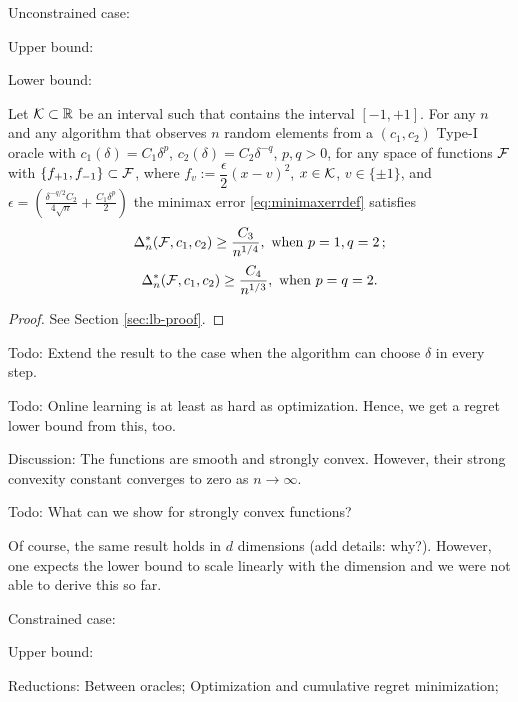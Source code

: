 
Unconstrained case:

Upper bound: 

Lower bound:
\begin{theorem}
Let $\mathcal{K}\subset \mathbb{R}$ be an interval such that contains the interval $[-1,+1]$.
 For any $n$ and any algorithm that observes $n$ random elements from a $(c_1,c_2)$ Type-I oracle 
 with $c_1(\delta) = C_1 \delta^p$, $c_2(\delta) = C_2 \delta^{-q}$, $p,q>0$,
 for any space of functions $\mathcal{F}$ with $\{f_{+1}, f_{-1} \}\subset \mathcal{F}$, 
 where $f_v:= \dfrac{\epsilon}{2} (x - v)^2$, $x\in \mathcal{K}$, $v\in \{\pm 1\}$,
and $\epsilon = \left(\frac{\delta^{-q/2}C_2}{4\sqrt{n}} + \frac{C_1\delta^p}{2}\right)$ 
 the minimax error \eqref{eq:minimaxerrdef} satisfies 
\[
\Delta_n^*(\mathcal{F}, c_1,c_2) \ge \dfrac{C_3}{ n^{1/4}}, \text{ when } p=1, q=2\,; 
\]
 \[
 \Delta_n^*(\mathcal{F}, c_1,c_2) \ge \dfrac{C_4}{ n^{1/3}},  \text{ when } p=q=2.
 \]
\end{theorem}
\begin{proof}
 See Section \ref{sec:lb-proof}.
\end{proof}
Todo: Extend the result to the case when the algorithm can choose $\delta$ in every step.

Todo: Online learning is at least as hard as optimization. Hence, we get a regret lower bound from this, too.

Discussion: The functions are smooth and strongly convex.
However, their strong convexity constant converges to zero as $n\to\infty$.

Todo: What can we show for strongly convex functions?

Of course, the same result holds in $d$ dimensions (add details: why?). However, one expects the lower bound to scale linearly with the dimension and we were not able to derive this so far.

Constrained case:

Upper bound: 

Reductions:
Between oracles;
Optimization and cumulative regret minimization;


